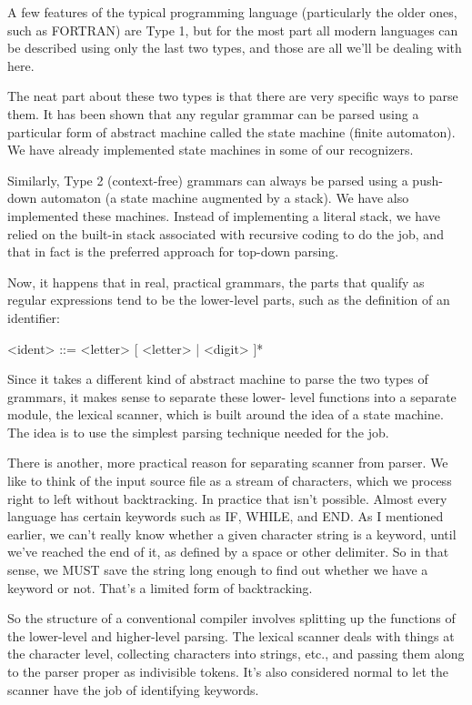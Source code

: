 \documentclass[float=false, crop=false]{standalone}
\begin{document}
A few features of the typical programming language (particularly the older ones,
such as FORTRAN) are Type 1, but for the most part all modern languages can be
described using only the last two types, and those are all we'll be dealing with
here.

The neat part about these two types is that there are very specific ways to
parse them. It has been shown that any regular grammar can be parsed using a
particular form of abstract machine called the state machine (finite automaton).
We have already implemented state machines in some of our recognizers.

Similarly, Type 2 (context-free) grammars can always be parsed using a push-down
automaton (a state machine augmented by a stack). We have also implemented these
machines. Instead of implementing a literal stack, we have relied on the
built-in stack associated with recursive coding to do the job, and that in fact
is the preferred approach for top-down parsing.

Now, it happens that in real, practical grammars, the parts that qualify as
regular expressions tend to be the lower-level parts, such as the definition of
an identifier:

     <ident> ::= <letter> [ <letter> | <digit> ]*

Since it takes a different kind of abstract machine to parse the two types of
grammars, it makes sense to separate these lower- level functions into a
separate module, the lexical scanner, which is built around the idea of a state
machine. The idea is to use the simplest parsing technique needed for the job.

There is another, more practical reason for separating scanner from parser. We
like to think of the input source file as a stream of characters, which we
process right to left without backtracking. In practice that isn't possible.
Almost every language has certain keywords such as IF, WHILE, and END. As I
mentioned earlier, we can't really know whether a given character string is a
keyword, until we've reached the end of it, as defined by a space or other
delimiter. So in that sense, we MUST save the string long enough to find out
whether we have a keyword or not. That's a limited form of backtracking.

So the structure of a conventional compiler involves splitting up the functions
of the lower-level and higher-level parsing. The lexical scanner deals with
things at the character level, collecting characters into strings, etc., and
passing them along to the parser proper as indivisible tokens. It's also
considered normal to let the scanner have the job of identifying keywords.
\end{document}
